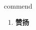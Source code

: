 
\begin{frame}
{\huge commend}
\begin{center}
\begin{enumerate}\Large
  \item \textbf{赞扬}
\end{enumerate}
\end{center}
\end{frame}
